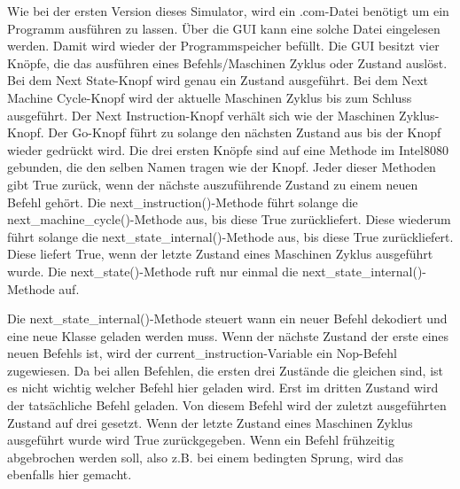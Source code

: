 \documentclass[12pt]{article}
\begin{document}
Wie bei der ersten Version dieses Simulator, wird ein .com-Datei benötigt um ein Programm ausführen zu lassen. Über die GUI kann eine solche Datei eingelesen werden. Damit wird wieder der Programmspeicher befüllt.
Die GUI besitzt vier Knöpfe, die das ausführen eines Befehls/Maschinen Zyklus oder Zustand auslöst. Bei dem \glqq Next State\grqq -Knopf wird genau ein Zustand ausgeführt. Bei dem \glqq Next Machine Cycle\grqq -Knopf wird der aktuelle Maschinen Zyklus bis zum Schluss ausgeführt. Der  \glqq Next Instruction\grqq -Knopf verhält sich wie der Maschinen Zyklus-Knopf. Der \glqq Go\grqq -Knopf führt zu solange den nächsten Zustand aus bis der Knopf wieder gedrückt wird. Die drei ersten Knöpfe sind auf eine Methode im Intel8080 gebunden, die den selben Namen tragen wie der Knopf. Jeder dieser Methoden gibt True zurück, wenn der nächste auszuführende Zustand zu einem neuen Befehl gehört. 
Die next\_instruction()-Methode führt solange die next\_machine\_cycle()-Methode aus, bis diese True zurückliefert. Diese wiederum führt solange die next\_state\_internal()-Methode aus, bis diese True zurückliefert. Diese liefert True, wenn der letzte Zustand eines Maschinen Zyklus ausgeführt wurde. Die next\_state()-Methode ruft nur einmal die next\_state\_internal()-Methode auf.

\noindent
Die next\_state\_internal()-Methode steuert wann ein neuer Befehl dekodiert und eine neue Klasse geladen werden muss. Wenn der nächste Zustand der erste eines neuen Befehls ist, wird der current\_instruction-Variable ein Nop-Befehl zugewiesen. Da bei allen Befehlen, die ersten drei Zustände die gleichen sind, ist es nicht wichtig welcher Befehl hier geladen wird. Erst im dritten Zustand wird der tatsächliche Befehl geladen. Von diesem Befehl wird der zuletzt ausgeführten Zustand auf drei gesetzt. Wenn der letzte Zustand eines Maschinen Zyklus ausgeführt wurde wird True zurückgegeben. Wenn ein Befehl frühzeitig abgebrochen werden soll, also z.B. bei einem bedingten Sprung, wird das ebenfalls hier gemacht.
\end{document}
